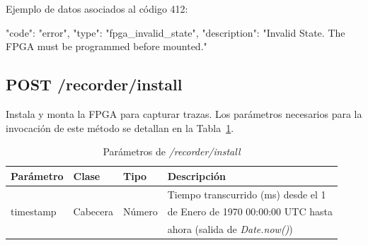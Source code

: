 \begin{itemize}
{\begin{minipage}{\textwidth}
Ejemplo de datos asociados al código 412:

\begin{code}[language=json]
{
  "code": "error",
  "type": "fpga_invalid_state",
  "description": "Invalid State. The FPGA must be programmed before mounted."
}
\end{code}
\end{minipage}
}

\end{itemize}

%
%
\subsection{POST /recorder/install}
Instala y monta la \gls{FPGA} para capturar \glspl{traza}.
Los parámetros necesarios para la invocación de este método se detallan en la Tabla~\ref{extra:api:recorderinstall:invocacion}.

\begin{table}[H]
\centering
\begin{tabular}{|l|l|l|l|}
\hline
\rowcolor[HTML]{F5F5F5}
\textbf{Parámetro}  & \textbf{Clase} & \textbf{Tipo} & \textbf{Descripción}                  \\ \hline
                    &                &               & Tiempo transcurrido (ms) desde el 1   \\
timestamp           & Cabecera       & Número        & de Enero de 1970 00:00:00 UTC hasta   \\
                    &                &               & ahora (salida de \textit{Date.now()}) \\ \hline
\end{tabular}
\caption{Parámetros de \textit{/recorder/install}}
\label{extra:api:recorderinstall:invocacion}
\end{table}

